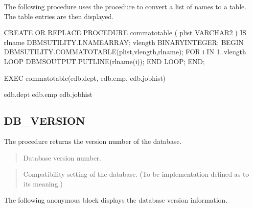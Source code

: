 \documentclass[letterpaper,10pt,english,openany,oneside]{sphinxmanual}
\begin{document}

The following procedure uses the  procedure to convert a
list of names to a table. The table entries are then displayed.

%
\begin{sphinxVerbatim}[commandchars=\\\{\}]
CREATE OR REPLACE PROCEDURE comma\PYGZus{}to\PYGZus{}table (
    p\PYGZus{}list      VARCHAR2
)
IS
    r\PYGZus{}lname     DBMS\PYGZus{}UTILITY.LNAME\PYGZus{}ARRAY;
    v\PYGZus{}length    BINARY\PYGZus{}INTEGER;
BEGIN
    DBMS\PYGZus{}UTILITY.COMMA\PYGZus{}TO\PYGZus{}TABLE(p\PYGZus{}list,v\PYGZus{}length,r\PYGZus{}lname);
    FOR i IN 1..v\PYGZus{}length LOOP
        DBMS\PYGZus{}OUTPUT.PUT\PYGZus{}LINE(r\PYGZus{}lname(i));
    END LOOP;
END;

EXEC comma\PYGZus{}to\PYGZus{}table(\PYGZsq{}edb.dept, edb.emp, edb.jobhist\PYGZsq{})

edb.dept
edb.emp
edb.jobhist
\end{sphinxVerbatim}

\newpage


\subsection{DB\_VERSION}
\label{\detokenize{dbms_utility:db-version}}
The  procedure returns the version number of the database.
\begin{quote}

\end{quote}


\begin{quote}

Database version number.
\end{quote}

\begin{quote}

Compatibility setting of the database. (To be implementation-defined as
to its meaning.)
\end{quote}


The following anonymous block displays the database version information.
\end{document}
